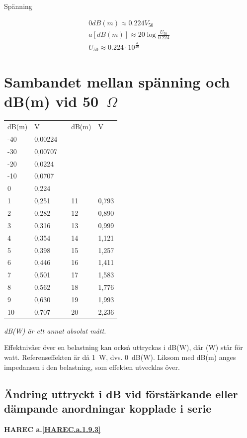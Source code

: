 Spänning

\begin{gather*}
	0 dB(m) \approx 0.224 V_{50} \\
	a [dB(m)] \approx 20 \log\frac{U_{50}}{0.224} \\
	U_{50} \approx 0.224 \cdot 10^{\frac{a}{20}}
\end{gather*}

\section[Sambandet spänning och dB(m)]{Sambandet mellan spänning och dB(m) vid 50~\(\Omega\)\)}
\begin{tabular}{l|lp{1cm}l|l}
	dB(m) & V & & dB(m) & V \\
	\cline{1-2} \cline{4-5}
	-40 & 0,00224 & & & \\
	-30 & 0,00707 & & & \\
	-20 & 0,0224  & & & \\
	-10 & 0,0707  & & & \\
	0   & 0,224   & & & \\
	1   & 0,251   & & 11 & 0,793 \\
	2   & 0,282   & & 12 & 0,890 \\
	3   & 0,316   & & 13 & 0,999 \\
	4   & 0,354   & & 14 & 1,121 \\
	5   & 0,398   & & 15 & 1,257 \\
	6   & 0,446   & & 16 & 1,411 \\
	7   & 0,501   & & 17 & 1,583 \\
	8   & 0,562   & & 18 & 1,776 \\
	9   & 0,630   & & 19 & 1,993 \\
	10  & 0,707   & & 20 & 2,236
\end{tabular}

\emph{dB(W) är ett annat absolut mått.}

Effektnivåer över en belastning kan också uttryckas i dB(W), där (W)
står för watt. Referenseffekten är då 1~W, dvs. 0~dB(W).
Liksom med dB(m) anges impedansen i den belastning, som effekten utvecklas över.

\subsection{Ändring uttryckt i dB vid förstärkande eller dämpande anordningar kopplade i serie}
\textbf{HAREC a.\ref{HAREC.a.1.9.3}\label{myHAREC.a.1.9.3}}

